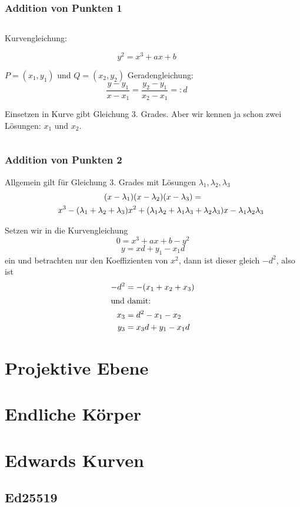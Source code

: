\documentclass{beamer}
\begin{document}
\begin{frame}
  \frametitle{Addition von Punkten 1}

  \begin{columns}[T]
    \begin{column}{5cm}
      Kurvengleichung:
      
      $$ y^2 = x^3 + a x + b $$

      $P = (x_1, y_1)$ und $Q = (x_2, y_2) $
      Geradengleichung:
      $$ \frac{y - y_1}{x - x_1} = \frac{y_2 - y_1}{x_2 - x_1} =: d $$

      Einsetzen in Kurve gibt Gleichung 3. Grades. Aber wir kennen
      ja schon zwei Lösungen: $x_1$ und $x_2$.
      
    \end{column}
    \begin{column}{5cm}
      
    \end{column}
  \end{columns}

\end{frame}
\begin{frame}
  \frametitle{Addition von Punkten 2}
  Allgemein gilt für Gleichung 3. Grades mit Lösungen
  $\lambda_1, \lambda_2, \lambda_3$
  \begin{multline*}
    (x - \lambda_1) (x - \lambda_2 ) (x - \lambda_3) = \\
    \shoveleft{\quad x^3 - (\lambda_1 + \lambda_2 + \lambda_3) x^2
    + (\lambda_1 \lambda_2 + \lambda_1 \lambda_3 +
      \lambda_2 \lambda_3) x - \lambda_1 \lambda_2 \lambda_3}
  \end{multline*}

  Setzen wir in die Kurvengleichung
  $$ 0 = x^3 + ax + b - y^2 $$
  $$y = x d + y_1 - x_1 d$$
  ein und betrachten nur den Koeffizienten von $x^2$, dann ist dieser
  gleich $-d^2$, also ist
  \begin{align*}
    - d^2  & = - (x_1 + x_2 + x_3) \\
    \intertext{und damit:}
    x_3    & = d^2 - x_1 - x_2 \\
    y_3    & = x_3 d + y_1 - x_1 d
  \end{align*}
\end{frame}

\section{Projektive Ebene}


\section{Endliche Körper}


\section{Edwards Kurven}

\subsection{Ed25519}

\begin{frame}
  
\end{frame}
\end{document}
